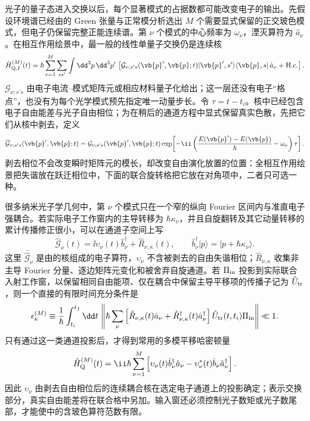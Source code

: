 
光子的量子态进入交换以后，每个显著模式的占据数都可能改变电子的输出。先假设环境谱已经由的 Green 张量与正常模分析选出 $M$ 个需要显式保留的正交玻色模式，但电子仍保留完整正能连续谱。第 $\nu$ 个模式的中心频率为 $\omega_\nu$，湮灭算符为 $\hat a_\nu$。在相互作用绘景中，最一般的线性单量子交换仍是连续核
\begin{equation}
{
\hat H_{{\rm Q},I}^{(M)}(t)
=
\hbar
\sum_{\nu=1}^{M}
\sum_{ss'}
\int\dd^3p\,\dd^3p'\,
\left[
\mathcal G_{\nu;s's}(\vb{p}',\vb{p};t)
|\vb{p}',s'\rangle\langle\vb{p},s|
\,\hat a_\nu
+\mathrm{H.c.}
\right].}
\label{eq:multimode_qpinem_continuous_kernel_dp101}
\end{equation}
$\mathcal G_{\nu;s's}$ 由电子电流--模式矩阵元或相应材料量子化给出；这一层还没有电子“格点”，也没有为每个光学模式预先指定唯一动量步长。令 $\tau=t-t_i$。核中已经包含电子自由能差与光子自由相位；为在稍后的通道方程中显式保留真实色散，先把它们从核中剥去，定义
\begin{equation}
 \overline{\mathcal G}_{\nu;s's}(\vb{p}',\vb{p};t)
 =\mathcal G_{\nu;s's}(\vb{p}',\vb{p};t)
 \exp\!\left[-\ii\left(\frac{E(\vb{p}')-E(\vb{p})}\hbar
                        -\omega_\nu\right)\tau\right].
 \label{eq:feqo-multimode-coupling-frame}
\end{equation}
剥去相位不会改变瞬时矩阵元的模长，却改变自由演化放置的位置：全相互作用绘景把失谐放在跃迁相位中，下面的联合旋转格把它放在对角项中，二者只可选一种。

很多纳米光子学几何中，第 $\nu$ 个模式只在一个窄的纵向 Fourier 区间内与准直电子强耦合。若实际电子工作窗内的主导转移为 $\hbar\kappa_\nu$，并且自旋翻转及其它动量转移的累计传播修正很小，可以在通道子空间上写
\[
\overline{\hat{\mathcal G}}_\nu(t)
=
\ii\upsilon_\nu(t)\hat b_\nu^\dagger
+\hat R_{\nu,\kappa}(t),
\qquad
\hat b_\nu^\dagger|p\rangle
=
|p+\hbar\kappa_\nu\rangle .
\]
这里 $\overline{\hat{\mathcal G}}_\nu$ 是由的核组成的电子算符，$\upsilon_\nu$ 不含被剥去的自由失谐相位；$\hat R_{\nu,\kappa}$ 收集非主导 Fourier 分量、逐边矩阵元变化和被舍弃自旋通道。若 $\Pi_{\rm in}$ 投影到实际联合入射工作窗，以保留相同自由能项、仅在耦合中保留主导平移项的传播子记为 $\hat U_{\rm tr}$，则一个直接的有限时间充分条件是
\begin{equation}
{
\epsilon_{\kappa}^{(M)}
\equiv
\frac1\hbar
\int_{t_i}^{t_f}\dd t\,
\left\|
\hbar\sum_\nu
\left[
\hat R_{\nu,\kappa}(t)\hat a_\nu
+\hat R_{\nu,\kappa}^\dagger(t)\hat a_\nu^\dagger
\right]
\hat U_{\rm tr}(t,t_i)\Pi_{\rm in}
\right\|
\ll1 .}
\label{eq:multimode_momentum_step_projection_error_dp101}
\end{equation}
只有通过这一类通道投影后，才得到常用的多模平移哈密顿量
\begin{equation}
{
 \hat H_{\rm Q}^{(M)}(t)
 =\ii\hbar\sum_{\nu=1}^{M}
 \left[
 \upsilon_\nu(t)\hat b_\nu^\dagger\hat a_\nu
 -\upsilon_\nu^*(t)\hat b_\nu\hat a_\nu^\dagger
 \right].}
\label{eq:multimode_qpinem_hamiltonian_dp47}
\end{equation}
因此 $\upsilon_\nu$ 由剥去自由相位后的连续耦合核在选定电子通道上的投影确定；表示交换部分，真实自由能差将在联合格中另加。输入窗还必须控制光子数矩或光子数尾部，才能使中的含玻色算符范数有限。

